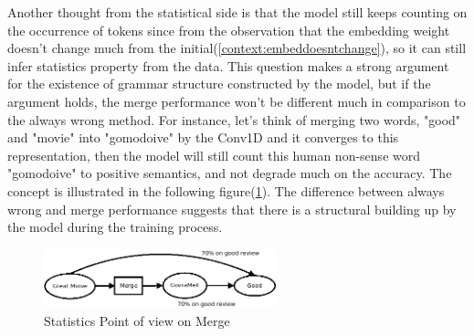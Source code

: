 \documentclass[12pt]{article}
\begin{document}
\label{text:alwayswrongArg}Another thought from the statistical side is that the model still keeps counting on the occurrence of tokens since from the observation that the embedding weight doesn't change much from the initial(\ref{context:embeddoesntchange}), so it can still infer statistics property from the data. This question makes a strong argument for the existence of grammar structure constructed by the model, but if the argument holds, the merge performance won't be different much in comparison to the always wrong method. For instance, let's think of merging two words, "good" and "movie" into "gomodoive" by the Conv1D and it converges to this representation, then the model will still count this human non-sense word "gomodoive" to positive semantics, and not degrade much on the accuracy. The concept is illustrated in the following figure(\ref{fig:merge_nonsense}). The difference between always wrong and merge performance suggests that there is a structural building up by the model during the training process. \\
\begin{figure}[!h] 
    \centering
    \includegraphics[width=0.6\textwidth]{figures/merge_countingArg.png}
    \caption{Statistics Point of view on Merge}
    \label{fig:merge_nonsense}
\end{figure}
\end{document}
